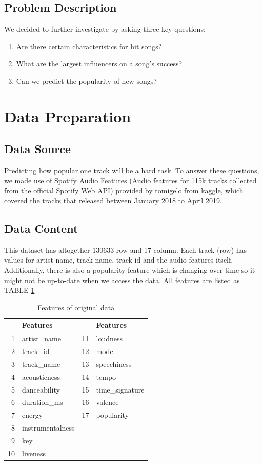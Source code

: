 \documentclass[conference]{IEEEtran}
\begin{document}
\subsection{Problem Description}
 We decided to further investigate by asking three key questions: 
\begin{enumerate}
  \item Are there certain characteristics for hit songs?
  \item What are the largest influencers on a song’s success?
  \item Can we predict the popularity of new songs? 
\end{enumerate}

\section{Data Preparation}
\subsection{Data Source}
Predicting how popular one track will be a hard task. To answer these questions, we made use of Spotify Audio Features (Audio features for 115k tracks collected from the official Spotify Web API) provided by tomigelo from kaggle\cite{tomigelo_2018}, which covered the tracks that released between January 2018 to April 2019.

\subsection{Data Content}
This dataset has altogether 130633 row and 17 column. Each track (row) has values for artist name, track name, track id and the audio features\cite{spotifyfordevelopers} itself. Additionally, there is also a popularity feature which is changing over time so it might not be up-to-date when we access the data. All features are listed as TABLE \ref{Features of original data}

\begin{table}[ht]
\centering
\caption{Features of original data}
\label{Features of original data}
\begin{tabular}{rlll}
  \hline
 & Features & &Features\\ 
  \hline
1 & artist\_name & 11 & loudness \\ 
  2 & track\_id &12 & mode\\ 
  3 & track\_name &13 & speechiness\\ 
  4 & acousticness &14 & tempo \\ 
  5 & danceability &15 & time\_signature \\ 
  6 & duration\_ms &16 & valence\\ 
  7 & energy &17 & popularity \\ 
  8 & instrumentalness &\\ 
  9 & key &\\ 
  10 & liveness &\\ 
   \hline
\end{tabular}
\end{table}
\end{document}
